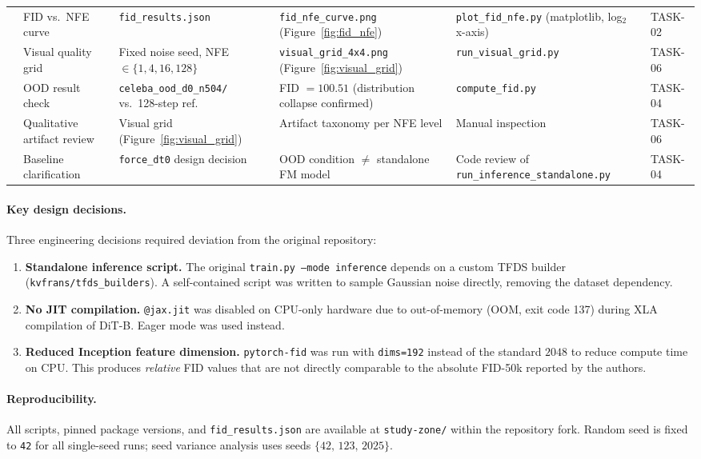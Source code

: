 \begin{table}[h]
{\begin{tabular}{clllll}
\midrule
{}
  & FID vs.\ NFE curve
    & \texttt{fid\_results.json}
    & \texttt{fid\_nfe\_curve.png} (Figure~\ref{fig:fid_nfe})
    & \texttt{plot\_fid\_nfe.py} (matplotlib, log$_2$ x-axis)
    & TASK-02 \\
  & Visual quality grid
    & Fixed noise seed, NFE $\in \{1,4,16,128\}$
    & \texttt{visual\_grid\_4x4.png} (Figure~\ref{fig:visual_grid})
    & \texttt{run\_visual\_grid.py}
    & TASK-06 \\

\midrule
{}
  & OOD result check
    & \texttt{celeba\_ood\_d0\_n504/} vs.\ 128-step ref.
    & FID $= 100.51$ (distribution collapse confirmed)
    & \texttt{compute\_fid.py}
    & TASK-04 \\
  & Qualitative artifact review
    & Visual grid (Figure~\ref{fig:visual_grid})
    & Artifact taxonomy per NFE level
    & Manual inspection
    & TASK-06 \\
  & Baseline clarification
    & \texttt{force\_dt0} design decision
    & OOD condition $\neq$ standalone FM model
    & Code review of \texttt{run\_inference\_standalone.py}
    & TASK-04 \\

\bottomrule
\end{tabular}%
}
\end{table}

\paragraph{Key design decisions.}
Three engineering decisions required deviation from the original repository:
\begin{enumerate}
    \item \textbf{Standalone inference script.}
          The original \texttt{train.py --mode inference} depends on a
          custom TFDS builder (\texttt{kvfrans/tfds\_builders}).
          A self-contained script was written to sample Gaussian noise
          directly, removing the dataset dependency.
    \item \textbf{No JIT compilation.}
          \texttt{@jax.jit} was disabled on CPU-only hardware due to
          out-of-memory (OOM, exit code 137) during XLA compilation of
          DiT-B. Eager mode was used instead.
    \item \textbf{Reduced Inception feature dimension.}
          \texttt{pytorch-fid} was run with \texttt{dims=192} instead of
          the standard $2048$ to reduce compute time on CPU.
          This produces \emph{relative} FID values that are not directly
          comparable to the absolute FID-50k reported by the authors.
\end{enumerate}

\paragraph{Reproducibility.}
All scripts, pinned package versions, and \texttt{fid\_results.json} are
available at \texttt{study-zone/} within the repository fork.
Random seed is fixed to \texttt{42} for all single-seed runs;
seed variance analysis uses seeds $\{42,\,123,\,2025\}$.
